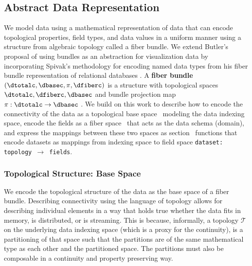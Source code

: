\documentclass[review]{vgtc}
\theoremstyle{definition}
\theoremstyle{remark}
\begin{document}
\subsection{Abstract Data Representation}
\label{sec:atct:fiber-bundles}
We model data using a mathematical representation of data that can encode topological properties, field types, and data values in a uniform manner using a structure from algebraic topology called a fiber bundle.  We extend Butler's proposal of using bundles as an abstraction for visualization data\cite{butlerVectorBundleClassesForm1992,butlerVisualizationModelBased1989} by incorporating Spivak's methodology for encoding named data types from his fiber bundle representation of relational databases \cite{spivakDatabasesAreCategories2010,spivakSimplicialDatabases2009}. A \textbf{fiber bundle} $(\dtotalc, \dbasec, \pi, \dfiberc)$ is a structure with topological spaces $\dtotalc, \dfiberc, \dbasec$ and bundle projection map $\pi: \dtotalc \rightarrow \dbasec$ \cite{spanier1989algebraic}. We build on this work to describe how to encode the connectivity of the data as a topological \textcolor{base}{base space} \dtotalc\ modeling the data indexing space, encode the fields as a \textcolor{fiber}{fiber space} \dfiberc\ that acts as the data schema (domain), and express the mappings between these two spaces as \textcolor{section}{section} \dsectionc\ functions that encode datasets as mappings from indexing space to field space \texttt{dataset: topology $\rightarrow$ fields}.

\subsubsection{\textcolor{base}{Topological Structure: Base Space \dbase}}
\label{sec:atct:fb:base}

We encode the topological structure of the data as the \textcolor{base}{base space} of a fiber bundle. Describing connectivity using the language of topology allows for describing individual elements in a way that holds true whether the data fits in memory, is distributed, or is streaming. This is because, informally, a topology $\mathcal{T}$ on the underlying data indexing space (which is a proxy for the continuity), is a partitioning of that space such that the partitions are of the same mathematical type as each other and the partitioned space. The partitions must also be composable in a continuity and property preserving way.
\end{document}
